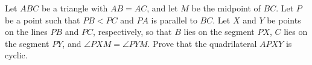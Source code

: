 Let $ABC$ be a triangle with $AB = AC$, and let $M$ be the midpoint of $BC$. Let $P$ be a point such that $PB < PC$ and $PA$ is parallel to $BC$. Let $X$ and $Y$ be points on the lines $PB$ and $PC$, respectively, so that $B$ lies on the segment $PX$, $C$ lies on the segment $PY$, and $\angle PXM = \angle PYM$. Prove that the quadrilateral $APXY$ is cyclic.
